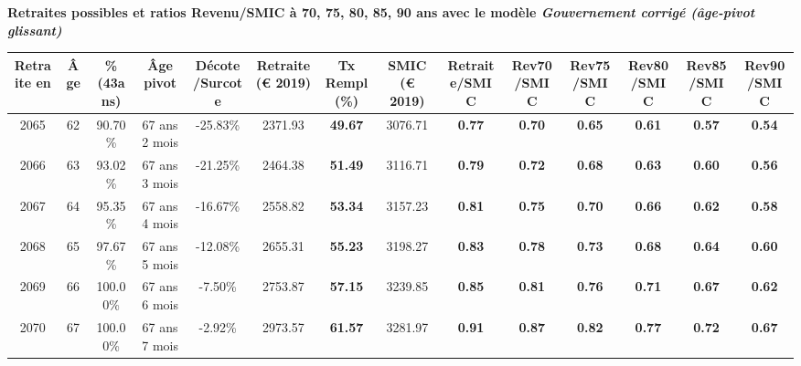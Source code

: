  \vspace{0.1cm} 
{\bf \noindent Retraites possibles et ratios Revenu/SMIC à 70, 75, 80, 85, 90 ans avec le modèle \emph{Gouvernement corrigé (âge-pivot glissant)}}  
 
\begin{adjustbox}{max width=\textwidth} 
\begin{tabular}[htb]{|c|c||c|c|c||c|c||c||c|c|c|c|c|c|} 
\hline 
 Retraite en &  Âge &  \%(43ans) &  Âge pivot &  Décote/Surcote &  Retraite (\euro{} 2019) &  Tx Rempl(\%) &  SMIC (\euro{} 2019) &  Retraite/SMIC &  Rev70/SMIC &  Rev75/SMIC &  Rev80/SMIC &  Rev85/SMIC &  Rev90/SMIC \\ 
\hline \hline 
 2065 &  62 &  90.70\% &  67 ans 2 mois &  -25.83\% &  2371.93 &  {\bf 49.67} &  3076.71 &  {\bf {\color{red} 0.77}} &  {\bf {\color{red} 0.70}} &  {\bf {\color{red} 0.65}} &  {\bf {\color{red} 0.61}} &  {\bf {\color{red} 0.57}} &  {\bf {\color{red} 0.54}} \\ 
\hline 
 2066 &  63 &  93.02\% &  67 ans 3 mois &  -21.25\% &  2464.38 &  {\bf 51.49} &  3116.71 &  {\bf {\color{red} 0.79}} &  {\bf {\color{red} 0.72}} &  {\bf {\color{red} 0.68}} &  {\bf {\color{red} 0.63}} &  {\bf {\color{red} 0.60}} &  {\bf {\color{red} 0.56}} \\ 
\hline 
 2067 &  64 &  95.35\% &  67 ans 4 mois &  -16.67\% &  2558.82 &  {\bf 53.34} &  3157.23 &  {\bf {\color{red} 0.81}} &  {\bf {\color{red} 0.75}} &  {\bf {\color{red} 0.70}} &  {\bf {\color{red} 0.66}} &  {\bf {\color{red} 0.62}} &  {\bf {\color{red} 0.58}} \\ 
\hline 
 2068 &  65 &  97.67\% &  67 ans 5 mois &  -12.08\% &  2655.31 &  {\bf 55.23} &  3198.27 &  {\bf {\color{red} 0.83}} &  {\bf {\color{red} 0.78}} &  {\bf {\color{red} 0.73}} &  {\bf {\color{red} 0.68}} &  {\bf {\color{red} 0.64}} &  {\bf {\color{red} 0.60}} \\ 
\hline 
 2069 &  66 &  100.00\% &  67 ans 6 mois &  -7.50\% &  2753.87 &  {\bf 57.15} &  3239.85 &  {\bf {\color{red} 0.85}} &  {\bf {\color{red} 0.81}} &  {\bf {\color{red} 0.76}} &  {\bf {\color{red} 0.71}} &  {\bf {\color{red} 0.67}} &  {\bf {\color{red} 0.62}} \\ 
\hline 
 2070 &  67 &  100.00\% &  67 ans 7 mois &  -2.92\% &  2973.57 &  {\bf 61.57} &  3281.97 &  {\bf {\color{red} 0.91}} &  {\bf {\color{red} 0.87}} &  {\bf {\color{red} 0.82}} &  {\bf {\color{red} 0.77}} &  {\bf {\color{red} 0.72}} &  {\bf {\color{red} 0.67}} \\ 
\hline 
\hline 
\end{tabular} 
\end{adjustbox} 
 
